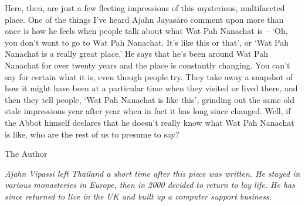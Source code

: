 Here, then, are just a few fleeting impressions of this mysterious,
multifaceted place. One of the things I've heard Ajahn Jayasāro comment
upon more than once is how he feels when people talk about what Wat Pah
Nanachat is -- `Oh, you don't want to go to Wat Pah Nanachat. It's like
this or that', or `Wat Pah Nanachat is a really great place.' He says
that he's been around Wat Pah Nanachat for over twenty years and the
place is constantly changing. You can't say for certain what it is, even
though people try. They take away a snapshot of how it might have been
at a particular time when they visited or lived there, and then they
tell people, `Wat Pah Nanachat is like this', grinding out the same old
stale impressions year after year when in fact it has long since
changed. Well, if the Abbot himself declares that he doesn't really know
what Wat Pah Nanachat is like, who are the rest of us to presume to say?

The Author

\emph{Ajahn Vipassi left Thailand a short time after this piece was
written. He stayed in various monasteries in Europe, then in 2000
decided to return to lay life. He has since returned to live in the UK
and built up a computer support business.}

